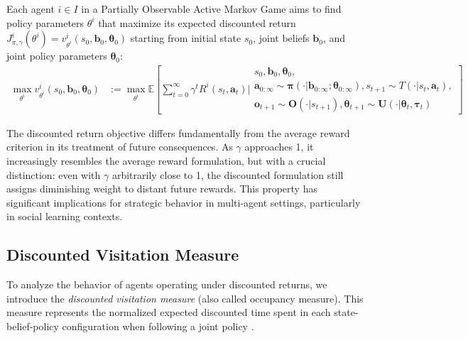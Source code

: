 \begin{definition}
    Each agent $i \in I$ in a Partially Observable Active Markov Game aims to find policy parameters $\theta^i$ that maximize its expected discounted return $J^i_{\pi, \gamma}(\theta^i) = v^i_{\theta^i}(s_0, \boldsymbol{b}_0, \boldsymbol{\theta}_0)$ starting from initial state $s_0$, joint beliefs $\boldsymbol{b}_0$, and joint policy parameters $\boldsymbol{\theta}_0$:
    \begin{align}
        \max_{\theta^i} v^i_{\theta^i}(s_0, \boldsymbol{b}_0, \boldsymbol{\theta}_0) & := \max_{\theta^i} \mathbb{E}\left[ \sum_{t=0}^{\infty} \gamma^t R^i(s_t, \boldsymbol{a}_t) \bigg|
            \begin{array}{c}
                s_0, \boldsymbol{b}_0, \boldsymbol{\theta}_0, \\
                \boldsymbol{a}_{0:\infty} \sim \boldsymbol{\pi}(\cdot|\boldsymbol{b}_{0:\infty}; \boldsymbol{\theta}_{0:\infty}),
                s_{t+1} \sim T(\cdot|s_t, \boldsymbol{a}_t),  \\
                \boldsymbol{o}_{t+1} \sim \boldsymbol{O}(\cdot|s_{t+1}),
                \boldsymbol{\theta}_{t+1} \sim \boldsymbol{U}(\cdot|\boldsymbol{\theta}_t, \boldsymbol{\tau}_t)
            \end{array}
            \right]
    \end{align}

\end{definition}

The discounted return objective differs fundamentally from the average reward criterion in its treatment of future consequences. As $\gamma$ approaches 1, it increasingly resembles the average reward formulation, but with a crucial distinction: even with $\gamma$ arbitrarily close to 1, the discounted formulation still assigns diminishing weight to distant future rewards. This property has significant implications for strategic behavior in multi-agent settings, particularly in social learning contexts.

\subsection{Discounted Visitation Measure}

To analyze the behavior of agents operating under discounted returns, we introduce the \textit{discounted visitation measure} (also called occupancy measure). This measure represents the normalized expected discounted time spent in each state-belief-policy configuration when following a joint policy \citep{sutton1999policy, Silver2014DeterministicPG}.

